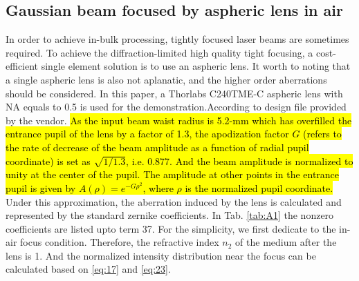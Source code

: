 \documentclass[9pt,twocolumn,twoside]{osajnl}
\begin{document}
\subsection{Gaussian beam focused by aspheric lens in air}
In order to achieve in-bulk processing, tightly focused laser beams are sometimes required. To achieve the diffraction-limited high quality tight focusing, a cost-efficient single element solution is to use an aspheric lens. It worth to noting that a single aspheric lens is also not aplanatic, and the higher order aberrations should be considered.
In this paper, a Thorlabs C240TME-C aspheric lens with NA equals to 0.5 is used for the demonstration.According to design file provided by the vendor. \hl{As the input beam waist radius is 5.2-mm which has overfilled the entrance pupil of the lens by a factor of 1.3, the apodization factor $G$ (refers to the rate of decrease of the beam amplitude as a function of radial pupil coordinate) is set as $\sqrt{1/1.3}$, i.e. 0.877. And the beam amplitude is normalized to unity at the center of the pupil. The amplitude at other points in the entrance pupil is given by $A(\rho)=e^{-G\rho^2}$, where $\rho$ is the normalized pupil coordinate.} Under this approximation, the aberration induced by the lens is calculated and represented by the standard zernike coefficients. In Tab. \ref{tab:A1} the nonzero coefficients are listed upto term 37. For the simplicity, we first dedicate to the in-air focus condition. Therefore, the refractive index $n_2$ of the medium after the lens is 1. And the normalized intensity distribution near the focus can be calculated based on \eqref{eq:17} and \eqref{eq:23}. 
\end{document}
